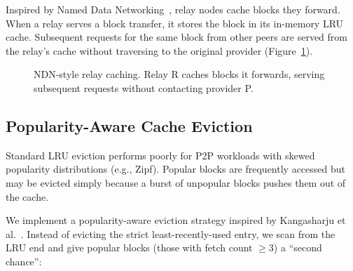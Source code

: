 \documentclass[sigconf,nonacm]{acmart}
\begin{document}
Inspired by Named Data Networking~\cite{jacobson2009networking,zhang2014ndn}, relay nodes cache blocks they forward. When a relay serves a block transfer, it stores the block in its in-memory LRU cache. Subsequent requests for the same block from other peers are served from the relay's cache without traversing to the original provider (Figure~\ref{fig:caching}).

\begin{figure}[t]
\centering
{}
\caption{NDN-style relay caching. Relay R caches blocks it forwards, serving subsequent requests without contacting provider P.}
\label{fig:caching}
\end{figure}

\subsection{Popularity-Aware Cache Eviction}

Standard LRU eviction performs poorly for P2P workloads with skewed popularity distributions (e.g., Zipf). Popular blocks are frequently accessed but may be evicted simply because a burst of unpopular blocks pushes them out of the cache.

We implement a popularity-aware eviction strategy inspired by Kangasharju et al.~\cite{kangasharju2002caching}. Instead of evicting the strict least-recently-used entry, we scan from the LRU end and give popular blocks (those with fetch count $\geq 3$) a ``second chance'':
\end{document}
